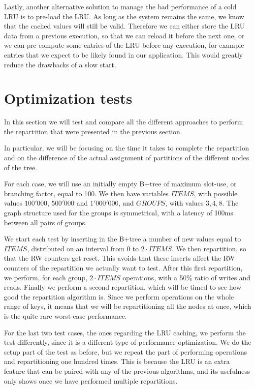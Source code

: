 Lastly, another alternative solution to manage the bad performance of a cold LRU is to pre-load the LRU. As long as the system remains the same, we know that the cached values will still be valid. Therefore we can either store the LRU data from a previous execution, so that we can reload it before the next one, or we can pre-compute some entries of the LRU before any execution, for example entries that we expect to be likely found in our application. This would greatly reduce the drawbacks of a slow start.

\chapter{Optimization tests}\label{sec:optimization-tests}
In this section we will test and compare all the different approaches to perform the repartition that were presented in the previous section.

In particular, we will be focusing on the time it takes to complete the repartition and on the difference of the actual assignment of partitions of the different nodes of the tree.

For each case, we will use an initially empty B+tree of maximum slot-use, or branching factor, equal to 100. We then have variables $ITEMS$, with possible values $100'000$, $500'000$ and $1'000'000$, and $GROUPS$, with values $3, 4, 8$. The graph structure used for the groups is symmetrical, with a latency of 100ms between all pairs of groups.

We start each test by inserting in the B+tree a number of new values equal to $ITEMS$, distributed on an interval from 0 to $2\cdot ITEMS$. We then repartition, so that the RW counters get reset. This avoids that these inserts affect the RW counters of the repartition we actually want to test. After this first repartition, we perform, for each group, $2\cdot ITEMS$ operations, with a 50\% ratio of writes and reads. Finally we perform a second repartition, which will be timed to see how good the repartition algorithm is. Since we perform operations on the whole range of keys, it means that we will be repartitioning all the nodes at once, which is the quite rare worst-case performance.

For the last two test cases, the ones regarding the LRU caching, we perform the test differently, since it is a different type of performance optimization. We do the setup part of the test as before, but we repeat the part of performing operations and repartitioning one hundred times. This is because the LRU is an extra feature that can be paired with any of the previous algorithms, and its usefulness only shows once we have performed multiple repartitions.

